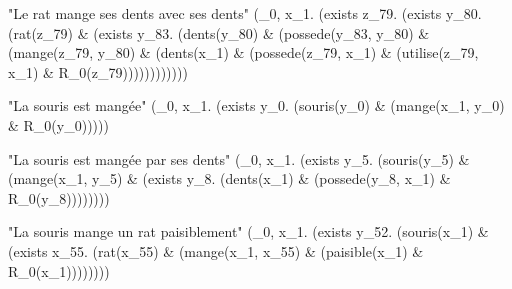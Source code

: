 \documentclass[12pt]{article}
\theoremstyle{exostyle}
\begin{document}
\begin{spverbatim}
"Le rat mange ses dents avec ses dents"
 (\R_0, x_1. (exists z_79. (exists y_80. (rat(z_79) & (exists y_83. (dents(y_80) & (possede(y_83, y_80) & (mange(z_79, y_80) & (dents(x_1) & (possede(z_79, x_1) & (utilise(z_79, x_1) & R_0(z_79))))))))))))

"La souris est mangée"
 (\R_0, x_1. (exists y_0. (souris(y_0) & (mange(x_1, y_0) & R_0(y_0)))))

"La souris est mangée par ses dents"
 (\R_0, x_1. (exists y_5. (souris(y_5) & (mange(x_1, y_5) & (exists y_8. (dents(x_1) & (possede(y_8, x_1) & R_0(y_8))))))))

"La souris mange un rat paisiblement"
 (\R_0, x_1. (exists y_52. (souris(x_1) & (exists x_55. (rat(x_55) & (mange(x_1, x_55) & (paisible(x_1) & R_0(x_1))))))))
\end{spverbatim}
\end{document}
